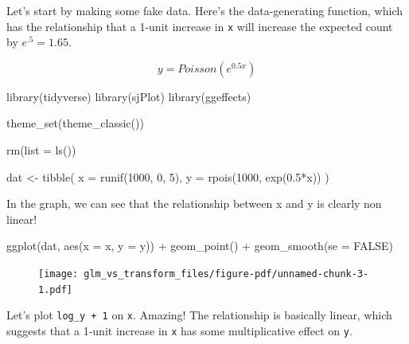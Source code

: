 \documentclass[
  letterpaper,
  DIV=11,
  numbers=noendperiod]{scrreprt}
\newenvironment{Shaded}{\begin{snugshade}}{\end{snugshade}}
\newcommand{\AttributeTok}[1]{\textcolor[rgb]{0.49,0.56,0.16}{#1}}
\newcommand{\ConstantTok}[1]{\textcolor[rgb]{0.53,0.00,0.00}{#1}}
\newcommand{\DecValTok}[1]{\textcolor[rgb]{0.25,0.63,0.44}{#1}}
\newcommand{\FloatTok}[1]{\textcolor[rgb]{0.25,0.63,0.44}{#1}}
\newcommand{\FunctionTok}[1]{\textcolor[rgb]{0.02,0.16,0.49}{#1}}
\newcommand{\NormalTok}[1]{\textcolor[rgb]{0.00,0.44,0.13}{#1}}
\newcommand{\OtherTok}[1]{\textcolor[rgb]{0.00,0.44,0.13}{#1}}
\newcommand{\SpecialCharTok}[1]{\textcolor[rgb]{0.25,0.44,0.63}{#1}}
\begin{document}
Let's start by making some fake data. Here's the data-generating
function, which has the relationship that a 1-unit increase in
\texttt{x} will increase the expected count by \(e^.5 = 1.65\).

\[
y = Poisson(e^{0.5x})
\]

\begin{Shaded}
\begin{Highlighting}[]
\FunctionTok{library}\NormalTok{(tidyverse)}
\FunctionTok{library}\NormalTok{(sjPlot)}
\FunctionTok{library}\NormalTok{(ggeffects)}

\FunctionTok{theme\_set}\NormalTok{(}\FunctionTok{theme\_classic}\NormalTok{())}

\FunctionTok{rm}\NormalTok{(}\AttributeTok{list =} \FunctionTok{ls}\NormalTok{())}

\NormalTok{dat }\OtherTok{\textless{}{-}} \FunctionTok{tibble}\NormalTok{(}
  \AttributeTok{x =} \FunctionTok{runif}\NormalTok{(}\DecValTok{1000}\NormalTok{, }\DecValTok{0}\NormalTok{, }\DecValTok{5}\NormalTok{),}
  \AttributeTok{y =} \FunctionTok{rpois}\NormalTok{(}\DecValTok{1000}\NormalTok{, }\FunctionTok{exp}\NormalTok{(}\FloatTok{0.5}\SpecialCharTok{*}\NormalTok{x))}
\NormalTok{)}
\end{Highlighting}
\end{Shaded}

In the graph, we can see that the relationship between x and y is
clearly non linear!

\begin{Shaded}
\begin{Highlighting}[]
\FunctionTok{ggplot}\NormalTok{(dat, }\FunctionTok{aes}\NormalTok{(}\AttributeTok{x =}\NormalTok{ x, }\AttributeTok{y =}\NormalTok{ y)) }\SpecialCharTok{+}
  \FunctionTok{geom\_point}\NormalTok{() }\SpecialCharTok{+}
  \FunctionTok{geom\_smooth}\NormalTok{(}\AttributeTok{se =} \ConstantTok{FALSE}\NormalTok{)}
\end{Highlighting}
\end{Shaded}

\begin{figure}[H]

{\centering \texttt{[image: glm\_vs\_transform\_files/figure-pdf/unnamed-chunk-3-1.pdf]}

}

\end{figure}

Let's plot \texttt{log\_y\ +\ 1} on \texttt{x}. Amazing! The
relationship is basically linear, which suggests that a 1-unit increase
in \texttt{x} has some multiplicative effect on \texttt{y}.
\end{document}
